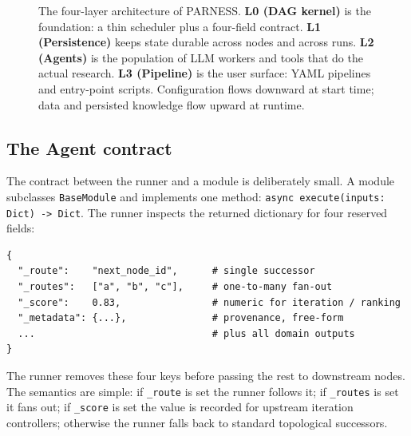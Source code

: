 \documentclass{article}
\newcommand{\parness}{\textsf{PARNESS}}
\newcommand{\code}[1]{\texttt{\small #1}}
\begin{document}
\begin{figure}[t]
\caption{The four-layer architecture of \parness{}. \textbf{L0 (DAG
kernel)} is the foundation: a thin scheduler plus a four-field contract.
\textbf{L1 (Persistence)} keeps state durable across nodes and across
runs. \textbf{L2 (Agents)} is the population of LLM workers and tools
that do the actual research. \textbf{L3 (Pipeline)} is the user surface:
YAML pipelines and entry-point scripts. Configuration flows downward at
start time; data and persisted knowledge flow upward at runtime.}
\label{fig:layers}
\end{figure}

\subsection{The Agent contract}
\label{sec:contract}
The contract between the runner and a module is deliberately small. A
module subclasses \code{BaseModule} and implements one method:
\code{async execute(inputs: Dict) -> Dict}. The runner inspects the
returned dictionary for four reserved fields:

\begin{lstlisting}[caption={The four-field Agent contract}, label={lst:contract}]
{
  "_route":    "next_node_id",      # single successor
  "_routes":   ["a", "b", "c"],     # one-to-many fan-out
  "_score":    0.83,                # numeric for iteration / ranking
  "_metadata": {...},               # provenance, free-form
  ...                               # plus all domain outputs
}
\end{lstlisting}

The runner removes these four keys before passing the rest to downstream
nodes. The semantics are simple: if \code{\_route} is set the runner
follows it; if \code{\_routes} is set it fans out; if \code{\_score} is
set the value is recorded for upstream iteration controllers; otherwise
the runner falls back to standard topological successors.
\end{document}
